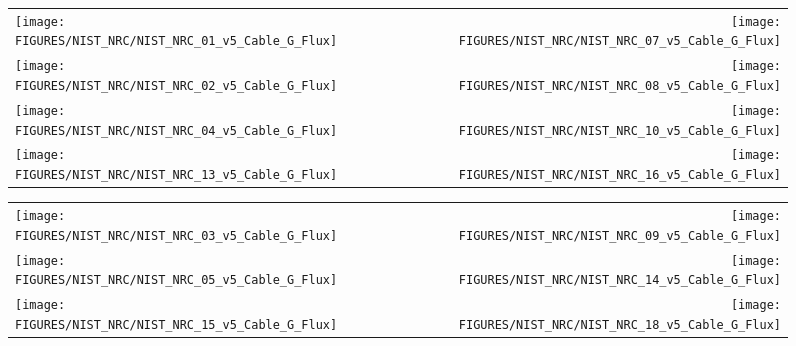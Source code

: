 
\begin{figure}[h!]
\begin{tabular*}{\textwidth}{l@{\extracolsep{\fill}}r}
\texttt{[image: FIGURES/NIST\_NRC/NIST\_NRC\_01\_v5\_Cable\_G\_Flux]} &
\texttt{[image: FIGURES/NIST\_NRC/NIST\_NRC\_07\_v5\_Cable\_G\_Flux]} \\
\texttt{[image: FIGURES/NIST\_NRC/NIST\_NRC\_02\_v5\_Cable\_G\_Flux]} &
\texttt{[image: FIGURES/NIST\_NRC/NIST\_NRC\_08\_v5\_Cable\_G\_Flux]} \\
\texttt{[image: FIGURES/NIST\_NRC/NIST\_NRC\_04\_v5\_Cable\_G\_Flux]} &
\texttt{[image: FIGURES/NIST\_NRC/NIST\_NRC\_10\_v5\_Cable\_G\_Flux]} \\
\texttt{[image: FIGURES/NIST\_NRC/NIST\_NRC\_13\_v5\_Cable\_G\_Flux]} &
\texttt{[image: FIGURES/NIST\_NRC/NIST\_NRC\_16\_v5\_Cable\_G\_Flux]}
\end{tabular*}
\label{NIST_NRC_Cable_G_Flux_Closed}
\end{figure}

\begin{figure}[h!]
\begin{tabular*}{\textwidth}{l@{\extracolsep{\fill}}r}
\texttt{[image: FIGURES/NIST\_NRC/NIST\_NRC\_03\_v5\_Cable\_G\_Flux]} &
\texttt{[image: FIGURES/NIST\_NRC/NIST\_NRC\_09\_v5\_Cable\_G\_Flux]} \\
\texttt{[image: FIGURES/NIST\_NRC/NIST\_NRC\_05\_v5\_Cable\_G\_Flux]} &
\texttt{[image: FIGURES/NIST\_NRC/NIST\_NRC\_14\_v5\_Cable\_G\_Flux]} \\
\texttt{[image: FIGURES/NIST\_NRC/NIST\_NRC\_15\_v5\_Cable\_G\_Flux]} &
\texttt{[image: FIGURES/NIST\_NRC/NIST\_NRC\_18\_v5\_Cable\_G\_Flux]}
\end{tabular*}
\label{NIST_NRC_Cable_G_Flux_Open}
\end{figure}




